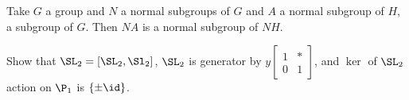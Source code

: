 \documentclass{amsart}
\begin{document}
\begin{exercise}
	Take $G $ a group and $N$ a normal subgroups of $G $ and $A $ a normal subgroup of $H $, a subgroup of $G $.
	Then $NA $ is a normal subgroup of $NH$.
\end{exercise}
\begin{exercise}
	Show that $\SL_{2} = [\SL_{2},\Sl_{2}] $, $\SL_{2} $ is generator by $y\begin{bmatrix} 1 & \ast \\ 0 & 1 \end{bmatrix}  $, and $\ker $ of $\SL_{2} $ action on $\P_{1} $ is $\{\pm \id\}   $.
\end{exercise}
\end{document}
